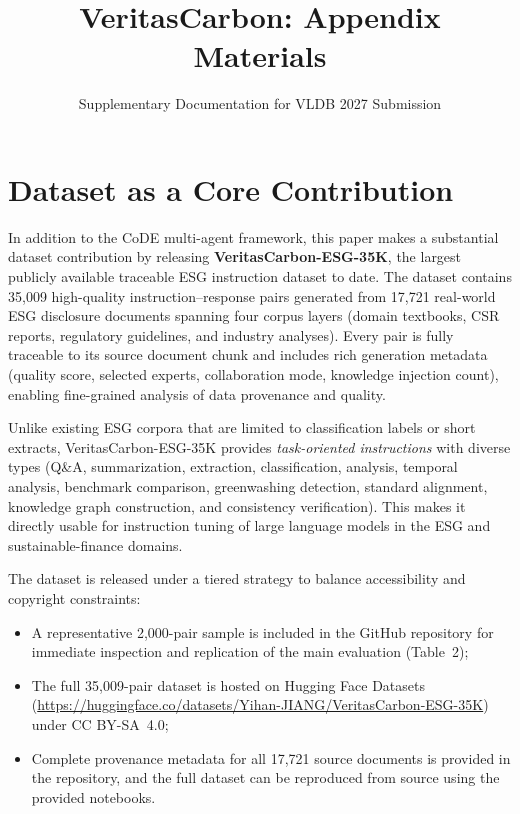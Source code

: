\documentclass[sigconf,nonacm]{acmart}
\begin{document}
\title{VeritasCarbon: Appendix Materials}
\subtitle{Supplementary Documentation for VLDB 2027 Submission}

\maketitle

\section*{Dataset as a Core Contribution}

In addition to the CoDE multi-agent framework, this paper makes a substantial dataset contribution by releasing \textbf{VeritasCarbon-ESG-35K}, the largest publicly available traceable ESG instruction dataset to date. The dataset contains 35,009 high-quality instruction--response pairs generated from 17,721 real-world ESG disclosure documents spanning four corpus layers (domain textbooks, CSR reports, regulatory guidelines, and industry analyses). Every pair is fully traceable to its source document chunk and includes rich generation metadata (quality score, selected experts, collaboration mode, knowledge injection count), enabling fine-grained analysis of data provenance and quality.

Unlike existing ESG corpora that are limited to classification labels or short extracts, VeritasCarbon-ESG-35K provides \textit{task-oriented instructions} with diverse types (Q\&A, summarization, extraction, classification, analysis, temporal analysis, benchmark comparison, greenwashing detection, standard alignment, knowledge graph construction, and consistency verification). This makes it directly usable for instruction tuning of large language models in the ESG and sustainable-finance domains.

The dataset is released under a tiered strategy to balance accessibility and copyright constraints:
\begin{itemize}[noitemsep]
    \item A representative 2,000-pair sample is included in the GitHub repository for immediate inspection and replication of the main evaluation (Table~2);
    \item The full 35,009-pair dataset is hosted on Hugging Face Datasets (\url{https://huggingface.co/datasets/Yihan-JIANG/VeritasCarbon-ESG-35K}) under CC BY-SA~4.0;
    \item Complete provenance metadata for all 17,721 source documents is provided in the repository, and the full dataset can be reproduced from source using the provided notebooks.
\end{itemize}
\end{document}
